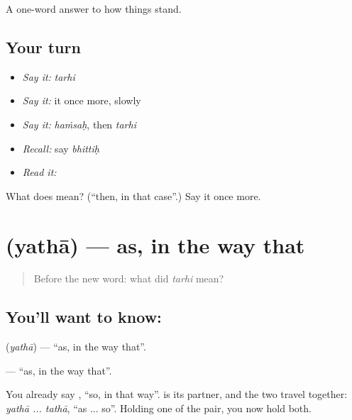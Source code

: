 \begin{grammarlens}[title={What you've built}]
A one-word answer to how things stand.
\end{grammarlens}

\subsection*{Your turn}
\begin{itemize}
\raggedright
  \item \emph{Say it:} \emph{tarhi}
  \item \emph{Say it:} it once more, slowly
  \item \emph{Say it:} \emph{haṁsaḥ}, then \emph{tarhi}
  \item \emph{Recall:} say \emph{bhittiḥ}
  \item \emph{Read it:} \textbf{}
\end{itemize}

\begin{tcolorbox}[breakable,colback=teal!4,colframe=teal!35!black,title={Before you move on}]
What does  mean? (\textquotedblleft{}then, in that case\textquotedblright{}.) Say it once more.
\end{tcolorbox}
\section[\texorpdfstring{\sk{यथा} (yathā)}{यथा (yathā)}]{ (yathā) — as, in the way that}

\label{lesson:SA-C49-as}



\begin{quote}
Before the new word: what did \emph{tarhi} mean?
\end{quote}

\subsection*{You'll want to know: }
\textbf{} (\emph{yathā}) — \textquotedblleft{}as, in the way that\textquotedblright{}.

\textbf{} — \textquotedblleft{}as, in the way that\textquotedblright{}.

You already say , \textquotedblleft{}so, in that way\textquotedblright{}. \textbf{} is its partner, and the two travel together: \emph{yathā ... tathā}, \textquotedblleft{}as ... so\textquotedblright{}. Holding one of the pair, you now hold both.

